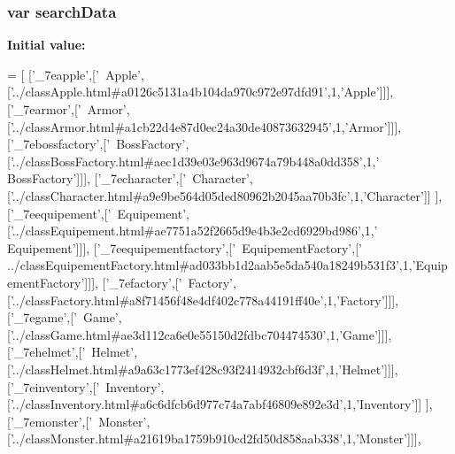 \subsubsection[{search\-Data}]{\setlength{\rightskip}{0pt plus 5cm}var search\-Data}\label{all__19_8js_ad01a7523f103d6242ef9b0451861231e}
{\bfseries Initial value\-:}
\begin{DoxyCode}
=
[
  [\textcolor{stringliteral}{'\_7eapple'},[\textcolor{stringliteral}{'~Apple'},[\textcolor{stringliteral}{'../classApple.html#a0126c5131a4b104da970c972e97dfd91'},1,\textcolor{stringliteral}{'Apple'}]]],
  [\textcolor{stringliteral}{'\_7earmor'},[\textcolor{stringliteral}{'~Armor'},[\textcolor{stringliteral}{'../classArmor.html#a1cb22d4e87d0ec24a30de40873632945'},1,\textcolor{stringliteral}{'Armor'}]]],
  [\textcolor{stringliteral}{'\_7ebossfactory'},[\textcolor{stringliteral}{'~BossFactory'},[\textcolor{stringliteral}{'../classBossFactory.html#aec1d39e03e963d9674a79b448a0dd358'},1,\textcolor{stringliteral}{'
      BossFactory'}]]],
  [\textcolor{stringliteral}{'\_7echaracter'},[\textcolor{stringliteral}{'~Character'},[\textcolor{stringliteral}{'../classCharacter.html#a9e9be564d05ded80962b2045aa70b3fc'},1,\textcolor{stringliteral}{'Character'}]]
      ],
  [\textcolor{stringliteral}{'\_7eequipement'},[\textcolor{stringliteral}{'~Equipement'},[\textcolor{stringliteral}{'../classEquipement.html#ae7751a52f2665d9e4b3e2cd6929bd986'},1,\textcolor{stringliteral}{'
      Equipement'}]]],
  [\textcolor{stringliteral}{'\_7eequipementfactory'},[\textcolor{stringliteral}{'~EquipementFactory'},[\textcolor{stringliteral}{'
      ../classEquipementFactory.html#ad033bb1d2aab5e5da540a18249b531f3'},1,\textcolor{stringliteral}{'EquipementFactory'}]]],
  [\textcolor{stringliteral}{'\_7efactory'},[\textcolor{stringliteral}{'~Factory'},[\textcolor{stringliteral}{'../classFactory.html#a8f71456f48e4df402c778a44191ff40e'},1,\textcolor{stringliteral}{'Factory'}]]],
  [\textcolor{stringliteral}{'\_7egame'},[\textcolor{stringliteral}{'~Game'},[\textcolor{stringliteral}{'../classGame.html#ae3d112ca6e0e55150d2fdbc704474530'},1,\textcolor{stringliteral}{'Game'}]]],
  [\textcolor{stringliteral}{'\_7ehelmet'},[\textcolor{stringliteral}{'~Helmet'},[\textcolor{stringliteral}{'../classHelmet.html#a9a63c1773ef428c93f2414932cbf6d3f'},1,\textcolor{stringliteral}{'Helmet'}]]],
  [\textcolor{stringliteral}{'\_7einventory'},[\textcolor{stringliteral}{'~Inventory'},[\textcolor{stringliteral}{'../classInventory.html#a6c6dfcb6d977c74a7abf46809e892e3d'},1,\textcolor{stringliteral}{'Inventory'}]]
      ],
  [\textcolor{stringliteral}{'\_7emonster'},[\textcolor{stringliteral}{'~Monster'},[\textcolor{stringliteral}{'../classMonster.html#a21619ba1759b910cd2fd50d858aab338'},1,\textcolor{stringliteral}{'Monster'}]]],

\end{DoxyCode}
